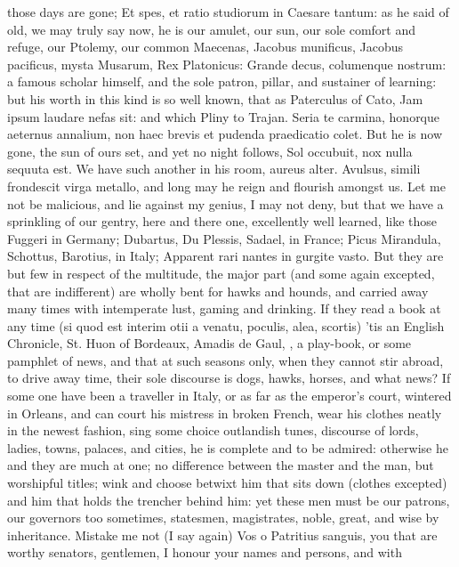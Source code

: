 {those days are gone; Et spes, et ratio studiorum in Caesare tantum:
 as he said of old, we may truly say now, he is our amulet, our
sun, our sole comfort and refuge, our Ptolemy, our common
Maecenas, Jacobus munificus, Jacobus pacificus, mysta Musarum, Rex
Platonicus: Grande decus, columenque nostrum: a famous scholar himself,
and the sole patron, pillar, and sustainer of learning: but his worth
in this kind is so well known, that as Paterculus of Cato, Jam ipsum
laudare nefas sit: and which  Pliny to Trajan. Seria te carmina,
honorque aeternus annalium, non haec brevis et pudenda praedicatio
colet. But he is now gone, the sun of ours set, and yet no night
follows, Sol occubuit, nox nulla sequuta est. We have such another in
his room, aureus alter. Avulsus, simili frondescit virga metallo,
and long may he reign and flourish amongst us.
Let me not be malicious, and lie against my genius, I may not deny, but
that we have a sprinkling of our gentry, here and there one,
excellently well learned, like those Fuggeri in Germany; Dubartus, Du
Plessis, Sadael, in France; Picus Mirandula, Schottus, Barotius, in
Italy; Apparent rari nantes in gurgite vasto. But they are but few in
respect of the multitude, the major part (and some again excepted, that
are indifferent) are wholly bent for hawks and hounds, and carried away
many times with intemperate lust, gaming and drinking. If they read a
book at any time (si quod est interim otii a venatu, poculis, alea,
scortis) 'tis an English Chronicle, St. Huon of Bordeaux, Amadis de
Gaul, \etc{}, a play-book, or some pamphlet of news, and that at such
seasons only, when they cannot stir abroad, to drive away time,
their sole discourse is dogs, hawks, horses, and what news? If
some one have been a traveller in Italy, or as far as the emperor's
court, wintered in Orleans, and can court his mistress in broken
French, wear his clothes neatly in the newest fashion, sing some choice
outlandish tunes, discourse of lords, ladies, towns, palaces, and
cities, he is complete and to be admired: otherwise he and they
are much at one; no difference between the master and the man, but
worshipful titles; wink and choose betwixt him that sits down (clothes
excepted) and him that holds the trencher behind him: yet these men
must be our patrons, our governors too sometimes, statesmen,
magistrates, noble, great, and wise by inheritance.
Mistake me not (I say again) Vos o Patritius sanguis, you that are
worthy senators, gentlemen, I honour your names and persons, and with
}

